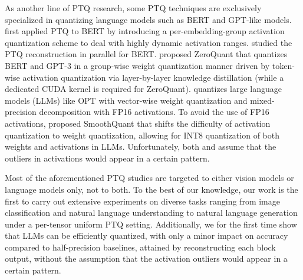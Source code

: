 \documentclass{article}
\theoremstyle{plain}
\theoremstyle{definition}
\theoremstyle{remark}
\begin{document}
As another line of PTQ research, some PTQ techniques are exclusively specialized in quantizing language models such as BERT and GPT-like models. \citet{bondarenko2021understanding} first applied PTQ to BERT by introducing a per-embedding-group activation quantization scheme to deal with highly dynamic activation ranges. 
\citet{bai2021towards} studied the PTQ reconstruction in parallel for BERT.
\citet{yao2022zeroquant} proposed ZeroQuant that quantizes BERT and GPT-3 in a group-wise weight quantization manner driven by token-wise activation quantization via layer-by-layer knowledge distillation (while a dedicated CUDA kernel is required for ZeroQuant).  
\citet{dettmers2022llm} quantizes large language models (LLMs) like OPT with vector-wise weight quantization and mixed-precision decomposition with FP16 activations. To avoid the use of FP16 activations, \citet{xiao2022smoothquant} proposed SmoothQuant that shifts the difficulty of activation quantization to weight quantization, 
allowing for INT8 quantization of both weights and activations in LLMs.
Unfortunately, both \citet{dettmers2022llm} and \citet{xiao2022smoothquant} assume that the outliers in activations would appear in a certain pattern.

Most of the aforementioned PTQ studies are targeted to either vision models or language models only, not to both. 
To the best of our knowledge, our work is the first to carry out extensive experiments on diverse tasks ranging from image classification and natural language understanding to natural language generation under a per-tensor uniform PTQ setting.
Additionally, we for the first time show that LLMs can be efficiently quantized, with only a minor impact on accuracy compared to half-precision baselines, attained by reconstructing each block output, without the assumption that the activation outliers would appear in a certain pattern.
\end{document}
